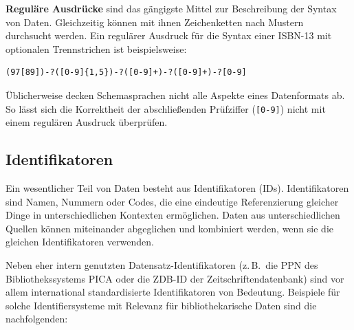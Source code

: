 \documentclass[
  11pt,
  letterpaper,
  DIV=11,
  twoside]{scrreprt}
\begin{document}
\begin{tcolorbox}[enhanced jigsaw, leftrule=.75mm, toprule=.15mm, left=2mm, opacityback=0, arc=.35mm, colback=white, breakable, colframe=quarto-callout-tip-color-frame, rightrule=.15mm, bottomrule=.15mm]
\begin{minipage}[t]{5.5mm}
\textcolor{quarto-callout-tip-color}{\faLightbulb}
\end{minipage}%
\begin{minipage}[t]{\textwidth - 5.5mm}

\textbf{Reguläre Ausdrücke} sind das gängigste Mittel zur Beschreibung
der Syntax von Daten. Gleichzeitig können mit ihnen Zeichenketten nach
Mustern durchsucht werden. Ein regulärer Ausdruck für die Syntax einer
ISBN-13 mit optionalen Trennstrichen ist beispielsweise:

\begin{verbatim}
(97[89])-?([0-9]{1,5})-?([0-9]+)-?([0-9]+)-?[0-9]
\end{verbatim}

Üblicherweise decken Schemasprachen nicht alle Aspekte eines
Datenformats ab. So lässt sich die Korrektheit der abschließenden
Prüfziffer (\texttt{{[}0-9{]}}) nicht mit einem regulären Ausdruck
überprüfen.

\end{minipage}%
\end{tcolorbox}

\subsection{Identifikatoren}\label{identifikatoren}

Ein wesentlicher Teil von Daten besteht aus Identifikatoren (IDs).
Identifikatoren sind Namen, Nummern oder Codes, die eine eindeutige
Referenzierung gleicher Dinge in unterschiedlichen Kontexten
ermöglichen. Daten aus unterschiedlichen Quellen können miteinander
abgeglichen und kombiniert werden, wenn sie die gleichen Identifikatoren
verwenden.

Neben eher intern genutzten Datensatz-Identifikatoren (z.\,B.~die {PPN}
des Bibliothekssystems PICA oder die ZDB-ID der Zeitschriftendatenbank)
sind vor allem international standardisierte Identifikatoren von
Bedeutung. Beispiele für solche Identifiersysteme mit Relevanz für
bibliothekarische Daten sind die nachfolgenden:
\end{document}
